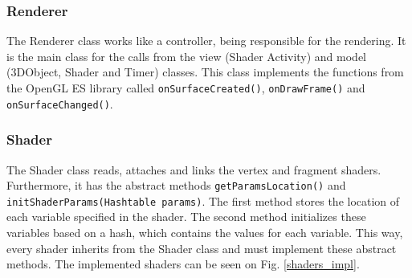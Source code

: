 \documentclass[10pt, conference, compsocconf]{IEEEtran}
\begin{document}
\subsubsection{Renderer}
	
The Renderer class works like a controller, being responsible for the 
rendering. It is the main class for the calls from the view (Shader Activity)
and model (3DObject, Shader and Timer) classes. This class implements the 
functions from the OpenGL ES library called \texttt{onSurfaceCreated()}, 
\texttt{onDrawFrame()} and \texttt{onSurfaceChanged()}.

\subsubsection{Shader}

The Shader class reads, attaches and links the vertex and fragment shaders.
Furthermore, it has the abstract methods \texttt{getParamsLocation()} and
\texttt{initShaderParams(Hashtable params)}. The first method stores the 
location of each variable specified in the shader. The second method initializes
these variables based on a hash, which contains the values for each variable. This way, 
every shader inherits from the Shader class and must implement these abstract methods.
The implemented shaders can be seen on Fig. \ref{shaders_impl}.
\end{document}
